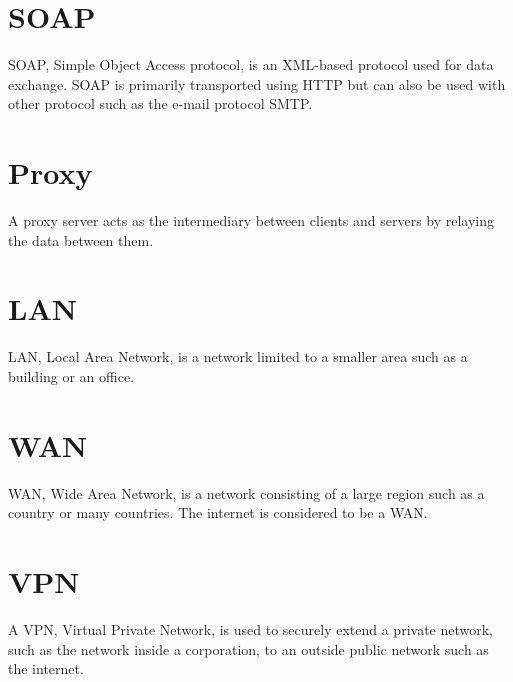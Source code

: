 \documentclass{cslthse-msc}
\begin{document}
\begin{appendices}
\section{SOAP}
SOAP, Simple Object Access protocol, is an XML-based protocol used for data exchange. SOAP is primarily transported using HTTP but can also be used with other protocol such as the e-mail protocol SMTP.

\section{Proxy}
A proxy server acts as the intermediary between clients and servers by relaying the data between them.

\section{LAN}
LAN, Local Area Network, is a network limited to a smaller area such as a building or an office.

\section{WAN}
WAN, Wide Area Network, is a network consisting of a large region such as a country or many countries. The internet is considered to be a WAN.

\section{VPN}
A VPN, Virtual Private Network, is used to securely extend a private network, such as the network inside a corporation, to an outside public network such as the internet.

\end{appendices}

\end{document}
